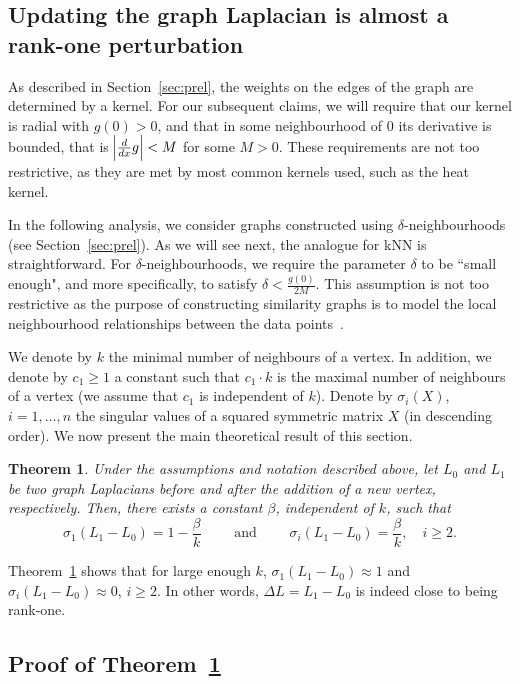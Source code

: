\documentclass[11pt]{article}
\newtheorem{theorem}{Theorem}[section]
\begin{document}
\subsection{Updating the graph Laplacian is almost a rank-one perturbation}

As described in Section~\ref{sec:prel}, the weights on the edges of the graph are determined by a kernel. For our subsequent claims, we will require that our kernel is radial with $g(0) > 0$, and that in some neighbourhood of $0$ its derivative is bounded, that is $\abs{\frac{d}{dx}g} < M$ for some $M > 0$. These requirements are not too restrictive, as they are met by most common kernels used, such as the heat kernel.  

In the following analysis, we consider graphs constructed using $\delta$-neighbourhoods (see Section~\ref{sec:prel}). As we will see next, the analogue for kNN is straightforward. For $\delta$-neighbourhoods, we require the parameter $\delta$ to be ``small enough", and more specifically, to satisfy $\delta < \frac{g(0)}{2M}$. This assumption is not too restrictive as the purpose of constructing similarity graphs is to model the local
neighbourhood relationships between the data points~\cite{von2007tutorial}.

We denote by $k$ the minimal number of neighbours of a vertex. In addition, we denote by $c_1 \ge 1$ a constant such that $c_1 \cdot k$ is the maximal number of neighbours of a vertex (we assume that $c_1$ is independent of $k$). Denote by $\sigma_i(X)$, $i=1,\ldots,n$ the singular values of a squared symmetric matrix $X$ (in descending order). We now present the main theoretical result of this section.
\begin{theorem} \label{thm:rankone}
Under the assumptions and notation described above, let $L_0$ and $L_1$ be two graph Laplacians before and after the addition of a new vertex, respectively. Then, there exists a constant $\beta$, independent of $k$, such that 
\[  \sigma_1(L_1 - L_0) = 1 - \frac{\beta}{k} \qquad \text{ and } \qquad \sigma_i(L_1 - L_0) =   \frac{\beta}{k}, \quad i \geq 2 . \] 
\end{theorem}
Theorem~\ref{thm:rankone} shows that for large enough $k$, $\sigma_1(L_1 - L_0) \approx 1$ and $\sigma_i(L_1 - L_0) \approx 0$, $ i \geq 2$. In other words, $\Delta L = L_1 - L_0$ is indeed close to being rank-one.

\subsection{Proof of Theorem~\ref{thm:rankone}}
\end{document}

